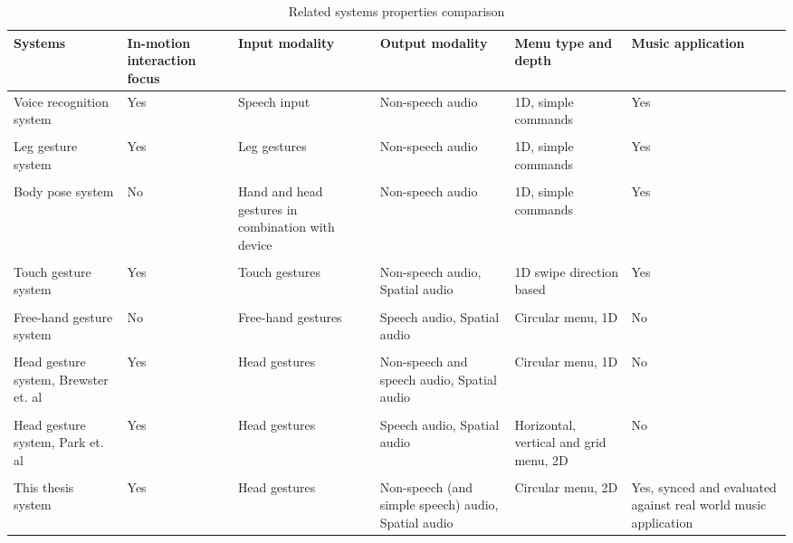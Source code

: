 \begin{table}[h] 
\caption{Related systems properties comparison} %


\begin{tabular}{L{3cm}C{2cm}C{2cm}C{2cm}C{2cm}C{2cm}} \toprule
	Systems & In-motion interaction focus & Input modality & Output modality & Menu type and depth & Music application \\ \midrule
    Voice recognition system \cite{stewart_boling_voice_2013}   & Yes & Speech input & Non-speech audio & 1D, simple commands & Yes \\
    \\
	Leg gesture system \cite{smus_running_2010}   & Yes & Leg gestures & Non-speech audio & 1D, simple commands & Yes \\ %
	\\
	Body pose system \cite{strachan_bodyspace_2007}   & No & Hand and head gestures in combination with device & Non-speech audio & 1D, simple commands & Yes \\
	\\
	Touch gesture system \cite{pirhonen_gestural_2002}   & Yes & Touch gestures & Non-speech audio, Spatial audio & 1D swipe direction based & Yes \\
	\\
	Free-hand gesture system \cite{kajastila_interaction_2013}   & No & Free-hand gestures & Speech audio, Spatial audio & Circular menu, 1D & No \\
	\\
	Head gesture system, Brewster et. al \cite{brewster_multimodaleyes-freeinteraction_2003}   & Yes & Head gestures & Non-speech and speech audio, Spatial audio & Circular menu, 1D & No  \\
	\\
	Head gesture system, Park et. al \cite{park_gaze-directed_2011}   & Yes & Head gestures & Speech audio, Spatial audio & Horizontal, vertical and grid menu, 2D & No \\
	\\
	This thesis system   & Yes & Head gestures & Non-speech (and simple speech) audio, Spatial audio & Circular menu, 2D & Yes, synced and evaluated against real world music application \\ \bottomrule
\end{tabular}

\label{tab:related} 
\end{table}








